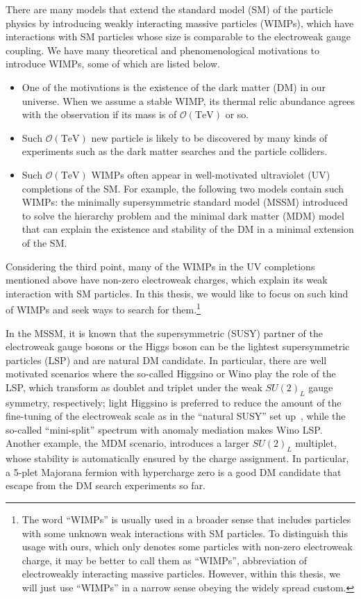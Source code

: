 \documentclass[12pt,twoside,book]{article}
\begin{document}
There are many models that extend the standard model (SM) of the particle physics by introducing weakly interacting massive particles (WIMPs), which have interactions with SM particles whose size is comparable to the electroweak gauge coupling.
We have many theoretical and phenomenological motivations to introduce WIMPs, some of which are listed below.
\begin{itemize}
  \item
    One of the motivations is the existence of the dark matter (DM) in our universe.
    When we assume a stable WIMP, its thermal relic abundance agrees with the observation if its mass is of $\mathcal{O}(\mathrm{TeV})$ or so.
  \item
    Such $\mathcal{O}(\mathrm{TeV})$ new particle is likely to be discovered by many kinds of experiments such as the dark matter searches and the particle colliders.
  \item
    Such $\mathcal{O}(\mathrm{TeV})$ WIMPs often appear in well-motivated ultraviolet (UV) completions of the SM.
    For example, the following two models contain such WIMPs: the minimally supersymmetric standard model (MSSM) introduced to solve the hierarchy problem and the minimal dark matter (MDM) model that can explain the existence and stability of the DM in a minimal extension of the SM.
\end{itemize}
Considering the third point, many of the WIMPs in the UV completions mentioned above have non-zero electroweak charges, which explain its weak interaction with SM particles.
In this thesis, we would like to focus on such kind of WIMPs and seek ways to search for them.\footnote
{
  The word ``WIMPs'' is usually used in a broader sense that includes particles with some unknown weak interactions with SM particles.
  To distinguish this usage with ours, which only denotes some particles with non-zero electroweak charge, it may be better to call them as ``WIMPs'', abbreviation of electroweakly interacting massive particles.
  However, within this thesis, we will just use ``WIMPs'' in a narrow sense obeying the widely spread custom.
}

In the MSSM, it is known that the supersymmetric (SUSY) partner of the electroweak gauge bosons or the Higgs boson can be the lightest supersymmetric particles (LSP) and are natural DM candidate.
In particular, there are well motivated scenarios where the so-called Higgsino or Wino play the role of the LSP, which transform as doublet and triplet under the weak $SU(2)_L$ gauge symmetry, respectively; light Higgsino is preferred to reduce the amount of the fine-tuning of the electroweak scale as in the ``natural SUSY'' set up~\cite{Kitano:2005wc, Brust:2011tb, Papucci:2011wy, Baer:2012uy}, while the so-called ``mini-split'' spectrum \cite{Wells:2003tf, Wells:2004di, ArkaniHamed:2004fb, Giudice:2004tc, ArkaniHamed:2004yi, ArkaniHamed:2005yv} with anomaly mediation \cite{Randall:1998uk, Giudice:1998xp} makes Wino LSP.
Another example, the MDM scenario, introduces a larger $SU(2)_L$ multiplet, whose stability is automatically ensured by the charge assignment.
In particular, a 5-plet Majorana fermion with hypercharge zero is a good DM candidate that escape from the DM search experiments so far.
\end{document}
